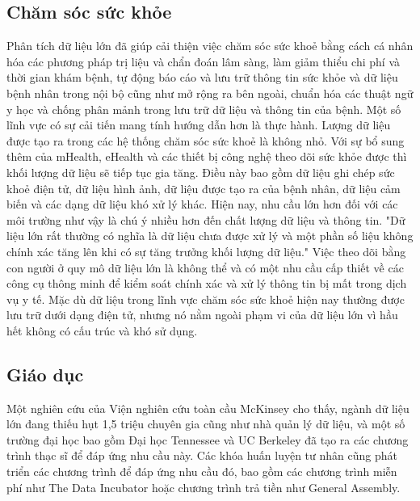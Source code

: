 \documentclass[12pt,a4paper]{report}
\begin{document}
\subsection{Chăm sóc sức khỏe}
Phân tích dữ liệu lớn đã giúp cải thiện việc chăm sóc sức khoẻ bằng cách cá nhân hóa các phương pháp trị liệu và chẩn đoán lâm sàng, làm giảm thiểu chi phí và thời gian khám bệnh, tự động báo cáo và lưu trữ thông tin sức khỏe và dữ liệu bệnh nhân trong nội bộ cũng như mở rộng ra bên ngoài, chuẩn hóa các thuật ngữ y học và chống phân mảnh trong lưu trữ dữ liệu và thông tin của bệnh. Một số lĩnh vực có sự cải tiến mang tính hướng dẫn hơn là thực hành. Lượng dữ liệu được tạo ra trong các hệ thống chăm sóc sức khoẻ là không nhỏ. Với sự bổ sung thêm của mHealth, eHealth và các thiết bị công nghệ theo dõi sức khỏe được thì khối lượng dữ liệu sẽ tiếp tục gia tăng. Điều này bao gồm dữ liệu ghi chép sức khoẻ điện tử, dữ liệu hình ảnh, dữ liệu được tạo ra của bệnh nhân, dữ liệu cảm biến và các dạng dữ liệu khó xử lý khác. Hiện nay, nhu cầu lớn hơn đối với các môi trường như vậy là chú ý nhiều hơn đến chất lượng dữ liệu và thông tin. "Dữ liệu lớn rất thường có nghĩa là dữ liệu chưa được xử lý và một phần số liệu không chính xác tăng lên khi có sự tăng trưởng khối lượng dữ liệu." Việc theo dõi bằng con người ở quy mô dữ liệu lớn là không thể và có một nhu cầu cấp thiết về các công cụ thông minh để kiểm soát chính xác và xử lý thông tin bị mất trong dịch vụ y tế. Mặc dù dữ liệu trong lĩnh vực chăm sóc sức khoẻ hiện nay thường được lưu trữ dưới dạng điện tử, nhưng nó nằm ngoài phạm vi của dữ liệu lớn vì hầu hết không có cấu trúc và khó sử dụng.
\subsection{Giáo dục}
Một nghiên cứu của Viện nghiên cứu toàn cầu McKinsey cho thấy, ngành dữ liệu lớn đang thiếu hụt 1,5 triệu chuyên gia cũng như nhà quản lý dữ liệu, và một số trường đại học bao gồm Đại học Tennessee và UC Berkeley đã tạo ra các chương trình thạc sĩ để đáp ứng nhu cầu này. Các khóa huấn luyện tư nhân cũng phát triển các chương trình để đáp ứng nhu cầu đó, bao gồm các chương trình miễn phí như The Data Incubator hoặc chương trình trả tiền như General Assembly.
\end{document}
